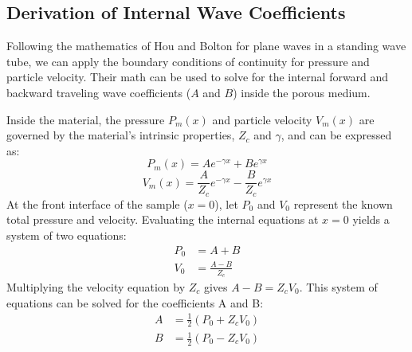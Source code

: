 \subsection{Derivation of Internal Wave Coefficients}
\label{sec: Internal Wave Equations}
Following the mathematics of Hou and Bolton \cite{hou2009transfer} for plane waves in a standing wave tube, we can apply the boundary conditions of continuity for pressure and particle velocity. Their math can be used to solve for the internal forward and backward traveling wave coefficients ($A$ and $B$) inside the porous medium.

Inside the material, the pressure $P_m(x)$ and particle velocity $V_m(x)$ are governed by the material's intrinsic properties, $Z_c$ and $\gamma$, and can be expressed as:
\begin{equation}
    P_m(x) = A e^{-\gamma x} + B e^{\gamma x}
\end{equation}
\begin{equation}
    V_m(x) = \frac{A}{Z_c} e^{-\gamma x} - \frac{B}{Z_c} e^{\gamma x}
\end{equation}
At the front interface of the sample ($x=0$), let $P_0$ and $V_0$ represent the known total pressure and velocity. Evaluating the internal equations at $x=0$ yields a system of two equations:
\begin{align}
    P_0 &= A + B \\
    V_0 &= \frac{A - B}{Z_c}
\end{align}
Multiplying the velocity equation by $Z_c$ gives $A - B = Z_c V_0$. This system of equations can be solved for the coefficients A and B:
\begin{align}
    \label{eq: coefficients for code}
    A &= \frac{1}{2}(P_0 + Z_c V_0) \\
    B &= \frac{1}{2}(P_0 - Z_c V_0)
\end{align}

